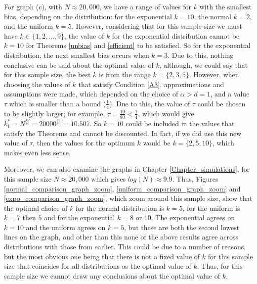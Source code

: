 \documentclass[12pt]{report}
\begin{document}
For graph (c), with $N \approx 20,000$, we have a range of values for $k$ with the smallest bias, depending on the distribution: for the exponential $k=10$, the normal $k=2$, and the uniform $k=5$. However, considering that for this sample size we must have $k \in \{1, 2, ..., 9\}$, the value of $k$ for the exponential distribution cannot be $k=10$ for Theorems \ref{unbias} and \ref{efficient} to be satisfied. So for the exponential distribution, the next smallest bias occurs when $k=3$. Due to this, nothing conclusive can be said about the optimal value of $k$, although, we could say that for this sample size, the best $k$ is from the range $k = \{2, 3, 5\}$. However, when choosing the values of $k$ that satisfy Condition \ref{A3}, approximations and assumptions were made, which depended on the choice of $\alpha > d = 1$, and a value $\tau$ which is smaller than a bound ($\frac{1}{4}$). Due to this, the value of $\tau$ could be chosen to be slightly larger; for example, $\tau = \frac{19}{80} < \frac{1}{4}$, which would give $k_{1}^{*} = N^{\frac{19}{80}} = 20000^{\frac{19}{80}} = 10.507$. So $k=10$ could be included in the values that satisfy the Theorems and cannot be discounted. In fact, if we did use this new value of $\tau$, then the values for the optimum $k$ would be $k = \{2, 5, 10\}$, which makes even less sense.


Moreover, we can also examine the graphs in Chapter \ref{Chapter_simulations}, for this sample size $N \approx 20,000$ which gives $log(N) \approx 9.9$. Thus, Figures \ref{normal_comparison_graph_zoom}, \ref{uniform_comparison_graph_zoom} and \ref{expo_comparison_graph_zoom}, which zoom around this sample size, show that the optimal choice of $k$ for the normal distribution is $k=5$, for the uniform is $k=7$ then $5$ and for the exponential $k=8$ or $10$. The exponential agrees on $k=10$ and the uniform agrees on $k=5$, but these are both the second lowest lines on the graph, and other than this none of the above results agree across distributions with those from earlier. This could be due to a number of reasons, but the most obvious one being that there is not a fixed value of $k$ for this sample size that coincides for all distributions as the optimal value of $k$. Thus, for this sample size we cannot draw any conclusions about the optimal value of $k$.
\end{document}
